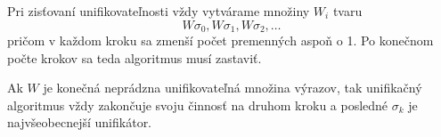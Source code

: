 \begin{poznamka}
    Pri zisťovaní unifikovateľnosti vždy vytvárame množiny $W_i$ tvaru
    \begin{equation*}
        W\sigma_0, W\sigma_1, W\sigma_2, \dots
    \end{equation*}
    pričom v každom kroku sa zmenší počet premenných aspoň o 1.
    Po konečnom počte krokov sa teda algoritmus musí zastaviť.
\end{poznamka}

\begin{veta}[Unifikačná]
    Ak $W$ je konečná neprádzna unifikovateľná množina výrazov,
    tak unifikačný algoritmus vždy zakončuje svoju činnosť na druhom kroku
    a posledné $\sigma_k$ je najvšeobecnejší unifikátor.
\end{veta}

